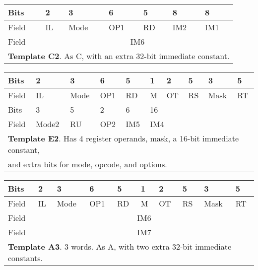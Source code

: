 \documentclass[forwardcom.tex]{subfiles}
\begin{document}
\begin{table}[h!] \label{table:templateC2}
\vv 
\begin{tabular}{|p{10mm}|p{10mm}|p{10mm}|p{10mm}|p{10mm}|p{38.5mm}|p{24mm}|} \hline
 Bits & 2 & 3 & 6 & 5 & \hspace{15mm} 8 & \hspace{8mm} 8 \\ \hline
Field & IL & Mode & OP1 & RD & \hspace{14mm} IM2 & \hspace{7mm} IM1 \\ \hline
Field & \multicolumn{6}{|c|}{ IM6 } \\ \hline
\multicolumn{7}{|l|}{
\textbf{Template C2}. As C, with an extra 32-bit immediate constant.} \\ \hline
\end{tabular}
\end{table}
\vv

\begin{table}[h!] \label{table:templateE2}
\vv 
\begin{tabular}{|p{10mm}|p{10mm}|p{10mm}|p{10mm}|p{10mm}|p{10mm}|p{10mm}|p{10mm}|p{10mm}|p{10mm}|} \hline
Bits & 2 & 3 & 6 & 5 & 1 & 2 & 5 & 3 & 5 \\ \hline
Field & IL & Mode & OP1 & RD & M & OT & RS & Mask & RT  \\ \hline
Bits & 3 & 5 & 2 & 6 & \multicolumn{5}{l|}{ \hspace{29mm} 16  } \\ \hline
Field  & Mode2 & RU & OP2 & IM5 & \multicolumn{5}{l|}{ \hspace{28mm} IM4 } \\ \hline
\multicolumn{10}{|l|}{
\textbf{Template E2}. Has 4 register operands, mask, a 16-bit immediate constant, } \\
\multicolumn{10}{|l|}{
and extra bits for mode, opcode, and options. } \\ \hline
\end{tabular}
\end{table}
\vv

\begin{table}[h!] \label{table:templateA3}
\vv
\begin{tabular}{|p{10mm}|p{10mm}|p{10mm}|p{10mm}|p{10mm}|p{10mm}|p{10mm}|p{10mm}|p{10mm}|p{10mm}|} \hline
 Bits & 2 & 3 & 6 & 5 & 1 & 2 & 5 & 3 & 5 \\ \hline
Field & IL & Mode & OP1 & RD & M & OT & RS & Mask & RT  \\ \hline
Field & \multicolumn{9}{|c|}{ IM6 } \\ \hline
Field & \multicolumn{9}{|c|}{ IM7 } \\ \hline
\multicolumn{10}{|l|}{
\textbf{Template A3}. 3 words. As A, with two extra 32-bit immediate constants.
} \\ \hline
\end{tabular}
\end{table}
\vv
\end{document}
